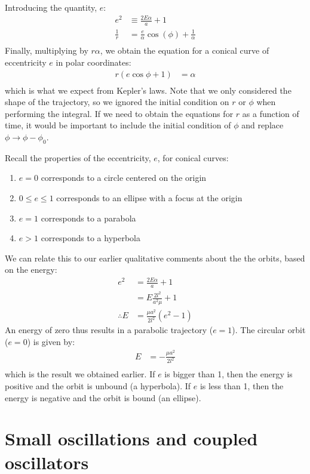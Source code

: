Introducing the quantity, $e$:
\begin{align}
e^2&\equiv \frac{2E\alpha}{a}+1\nonumber\\
\frac{1}{r}&=\frac{e}{\alpha}\cos(\phi)+\frac{1}{\alpha}\nonumber\\
\end{align}
Finally, multiplying by $r\alpha$, we obtain the equation for a conical curve of eccentricity $e$ in polar coordinates:
\begin{align}
r(e\cos\phi+1)&=\alpha\nonumber\\
\end{align}
which is what we expect from Kepler's laws. Note that we only considered the shape of the trajectory, so we ignored the initial condition on $r$ or $\phi$ when performing the integral. If we need to obtain the equations for $r$ as a function of time, it would be important to include the initial condition of $\phi$ and replace $\phi\to\phi-\phi_0$.

Recall the properties of the eccentricity, $e$, for conical curves:
\begin{enumerate}
\item $e=0$ corresponds to a circle centered on the origin
\item $0\leq e \leq 1$ corresponds to an ellipse with a focus at the origin
\item $e=1$ corresponds to a parabola
\item $e>1$ corresponds to a hyperbola
\end{enumerate}

We can relate this to our earlier qualitative comments about the the orbits, based on the energy:
\begin{align}
e^2&=\frac{2E\alpha}{a}+1 \nonumber\\
&=E\frac{2l^2}{a^2\mu}+1\nonumber\\
\therefore E&=\frac{\mu a^2}{2l^2}(e^2-1)
\end{align}
An energy of zero thus results in a parabolic trajectory ($e=1$). The circular orbit ($e=0$) is given by: 
\begin{align}
E&=-\frac{\mu a^2}{2l^2}\nonumber\\
\end{align} 
which is the result we obtained earlier. If $e$ is bigger than 1, then the energy is positive and the orbit is unbound (a hyperbola). If $e$ is less than 1, then the energy is negative and the orbit is bound (an ellipse). 

\section{Small oscillations and coupled oscillators}

